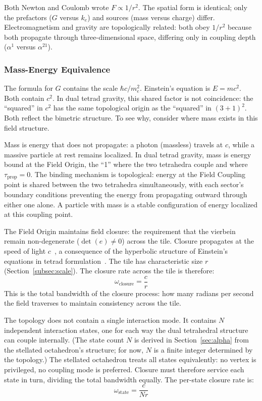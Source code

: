 \documentclass[aps,prd,preprint,superscriptaddress,showpacs,preprintnumbers,amsmath,amssymb,nofootinbib]{revtex4-2}
\begin{document}
Both Newton and Coulomb wrote $F \propto 1/r^2$. The spatial form is identical; only the prefactors ($G$ versus $k_e$) and sources (mass versus charge) differ. Electromagnetism and gravity are topologically related: both obey $1/r^2$ because both propagate through three-dimensional space, differing only in coupling depth ($\alpha^1$ versus $\alpha^{21}$).

\subsubsection*{Mass-Energy Equivalence}

The formula for $G$ contains the scale $\hbar c / m_e^2$. Einstein's equation is $E = mc^2$. Both contain $c^2$. In dual tetrad gravity, this shared factor is not coincidence: the ``squared'' in $c^2$ has the same topological origin as the ``squared'' in $(3{+}1)^2$. Both reflect the bimetric structure. To see why, consider where mass exists in this field structure.

Mass is energy that does not propagate: a photon (massless) travels at $c$, while a massive particle at rest remains localized. In dual tetrad gravity, mass is energy bound at the Field Origin, the ``1'' where the two tetrahedra couple and where $\tau_{\text{prop}} = 0$. The binding mechanism is topological: energy at the Field Coupling point is shared between the two tetrahedra simultaneously, with each sector's boundary conditions preventing the energy from propagating outward through either one alone. A particle with mass is a stable configuration of energy localized at this coupling point.

The Field Origin maintains field closure: the requirement that the vierbein remain non-degenerate ($\det(e) \neq 0$) across the tile. Closure propagates at the speed of light $c$~\cite{abbott2016}, a consequence of the hyperbolic structure of Einstein's equations in tetrad formulation~\cite{buchman2003}. The tile has characteristic size $r$ (Section~\ref{subsec:scale}). The closure rate across the tile is therefore:
\begin{equation}
\omega_{\text{closure}} = \frac{c}{r}
\label{eq:closure-rate-tile}
\end{equation}
This is the total bandwidth of the closure process: how many radians per second the field traverses to maintain consistency across the tile.

The topology does not contain a single interaction mode. It contains $N$ independent interaction states, one for each way the dual tetrahedral structure can couple internally. (The state count $N$ is derived in Section~\ref{sec:alpha} from the stellated octahedron's structure; for now, $N$ is a finite integer determined by the topology.) The stellated octahedron treats all states equivalently: no vertex is privileged, no coupling mode is preferred. Closure must therefore service each state in turn, dividing the total bandwidth equally. The per-state closure rate is:
\begin{equation}
\omega_{\text{state}} = \frac{c}{Nr}
\label{eq:per-state-rate}
\end{equation}
\end{document}

